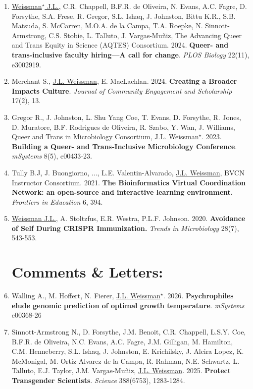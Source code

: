 \documentclass[]{res}
\begin{document}
\begin{resume}
\begin{enumerate}
\item \underline{Weissman$^\star$ J.L.}, C.R. Chappell, B.F.R. de Oliveira, N. Evans, A.C. Fagre, D. Forsythe, S.A. Frese, R. Gregor, S.L. Ishaq, J. Johnston, Bittu K.R., S.B. Matsuda, S. McCarren, M.O.A. de la Campa, T.A. Roepke, N. Sinnott-Armstrong, C.S. Stobie, L. Talluto, J. Vargas-Muñiz, The Advancing Queer and Trans Equity in Science (AQTES) Consortium. 2024. {\bf Queer- and trans-inclusive faculty hiring—A call for change}. \emph{PLOS Biology} 22(11), e3002919.

\item Merchant S., \underline{J.L. Weissman}, E. MacLachlan. 2024. {\bf Creating a Broader Impacts Culture}. \emph{Journal of Community Engagement and Scholarship} 17(2), 13.

 \item Gregor R., J. Johnston, L. Shu Yang Coe, T. Evans, D. Forsythe, R. Jones, D. Muratore, B.F. Rodrigues de Oliveira, R. Szabo, Y. Wan, J. Williams, Queer and Trans in Microbiology Consortium, \underline{J.L. Weissman$^\star$}. 2023. {\bf Building a Queer- and Trans-Inclusive Microbiology Conference}. \emph{mSystems} 8(5), e00433-23.
 
\item Tully B.J, J. Buongiorno, ..., L.E. Valentin-Alvarado, \underline{J.L. Weissman}, BVCN Instructor Consortium. 2021. {\bf The Bioinformatics Virtual Coordination Network: an open-source and interactive learning environment.} \emph{Frontiers in Education} 6, 394.

\item \underline{Weissman J.L.}, A. Stoltzfus, E.R. Westra, P.L.F. Johnson. 2020. {\bf Avoidance of Self During CRISPR Immunization.} \emph{Trends in Microbiology} 28(7), 543-553.

\section{Comments \& Letters:} \vspace{0mm}

\item Walling A., M. Hoffert, N. Fierer, \underline{J.L. Weissman$^\star$}. 2026. {\bf Psychrophiles elude genomic prediction of optimal growth temperature}. \emph{mSystems} e00368-26



\item Sinnott-Armstrong N., D. Forsythe, J.M. Benoit, C.R. Chappell, L.S.Y. Coe, B.F.R. de Oliveira, N.C. Evans, A.C. Fagre, J.M. Gilligan, M. Hamilton, C.M. Henneberry, S.L. Ishaq, J. Johnston, E. Krichilsky, J. Alcira Lopez, K. McMonigal, M. Ortiz Alvarez de la Campa, R. Rahman, N.E. Schwartz, L. Talluto, E.J. Taylor, J.M. Vargas-Muñiz, \underline{J.L. Weissman}. 2025. {\bf Protect Transgender Scientists}. \emph{Science}  388(6753), 1283-1284.


\end{enumerate}
\end{resume}
\end{document}
